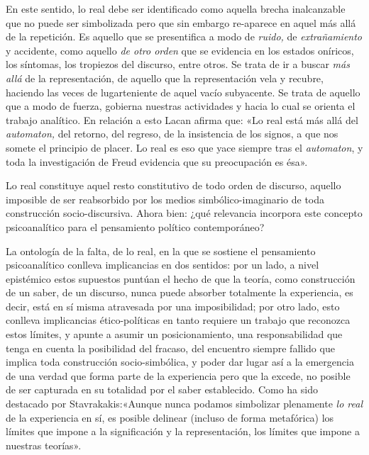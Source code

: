 En este sentido, lo real debe ser identificado como aquella brecha inalcanzable que no puede ser simbolizada pero que sin embargo re-aparece en aquel más allá de la repetición. Es aquello que se presentifica a modo de \emph{ruido, }de \emph{extrañamiento }y accidente, como aquello \emph{de otro orden} que se evidencia en los estados oníricos, los síntomas, los tropiezos del discurso, entre otros. Se trata de ir a buscar \emph{más allá} de la representación, de aquello que la representación vela y recubre, haciendo las veces de lugarteniente de aquel vacío subyacente. Se trata de aquello que a modo de fuerza, gobierna nuestras actividades y hacia lo cual se orienta el trabajo analítico. En relación a esto Lacan afirma que: «Lo real está más allá del \emph{automaton, }del retorno, del regreso, de la insistencia de los signos, a que nos somete el principio de placer. Lo real es eso que yace siempre tras el \emph{automaton}, y toda la investigación de Freud evidencia que su preocupación es ésa».

Lo real constituye aquel resto constitutivo de todo orden de discurso, aquello imposible de ser reabsorbido por los medios simbólico-imaginario de toda construcción socio-discursiva. Ahora bien: ¿qué relevancia incorpora este concepto psicoanalítico para el pensamiento político contemporáneo?

La ontología de la falta, de lo real, en la que se sostiene el pensamiento psicoanalítico conlleva implicancias en dos sentidos: por un lado, a nivel epistémico estos supuestos puntúan el hecho de que la teoría, como construcción de un saber, de un discurso, nunca puede absorber totalmente la experiencia, es decir, está en sí misma atravesada por una imposibilidad; por otro lado, esto conlleva implicancias ético-políticas en tanto requiere un trabajo que reconozca estos límites, y apunte a asumir un posicionamiento, una responsabilidad que tenga en cuenta la posibilidad del fracaso, del encuentro siempre fallido que implica toda construcción socio-simbólica, y poder dar lugar así a la emergencia de una verdad que forma parte de la experiencia pero que la excede, no posible de ser capturada en su totalidad por el saber establecido. Como ha sido destacado por Stavrakakis:«Aunque nunca podamos simbolizar plenamente \emph{lo real} de la experiencia en sí, es posible delinear (incluso de forma metafórica) los límites que impone a la significación y la representación, los límites que impone a nuestras teorías».


